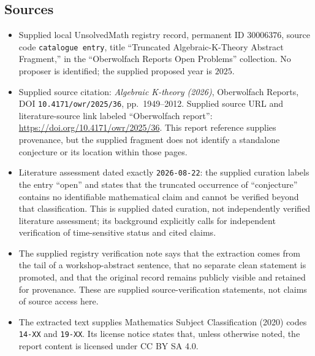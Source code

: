\documentclass[11pt]{article}
\begin{document}
\subsection{Sources}
\begin{itemize}
\item Supplied local UnsolvedMath registry record, permanent ID \(30006376\), source code \texttt{catalogue entry}, title ``Truncated Algebraic-K-Theory Abstract Fragment,'' in the ``Oberwolfach Reports Open Problems'' collection. No proposer is identified; the supplied proposed year is \(2025\).
\item Supplied source citation: \emph{Algebraic K-theory (2026)}, Oberwolfach Reports, DOI \texttt{10.4171/owr/2025/36}, pp.\ 1949--2012. Supplied source URL and literature-source link labeled ``Oberwolfach report'': \url{https://doi.org/10.4171/owr/2025/36}. This report reference supplies provenance, but the supplied fragment does not identify a standalone conjecture or its location within those pages.
\item Literature assessment dated exactly \texttt{2026-08-22}: the supplied curation labels the entry ``open'' and states that the truncated occurrence of ``conjecture'' contains no identifiable mathematical claim and cannot be verified beyond that classification. This is supplied dated curation, not independently verified literature assessment; its background explicitly calls for independent verification of time-sensitive status and cited claims.
\item The supplied registry verification note says that the extraction comes from the tail of a workshop-abstract sentence, that no separate clean statement is promoted, and that the original record remains publicly visible and retained for provenance. These are supplied source-verification statements, not claims of source access here.
\item The extracted text supplies Mathematics Subject Classification (2020) codes \texttt{14-XX} and \texttt{19-XX}. Its license notice states that, unless otherwise noted, the report content is licensed under CC BY SA 4.0.
\end{itemize}
\end{document}
